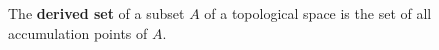 The \textbf{derived set} of a subset $A$ of a topological space is the set of all accumulation points of $A$.
